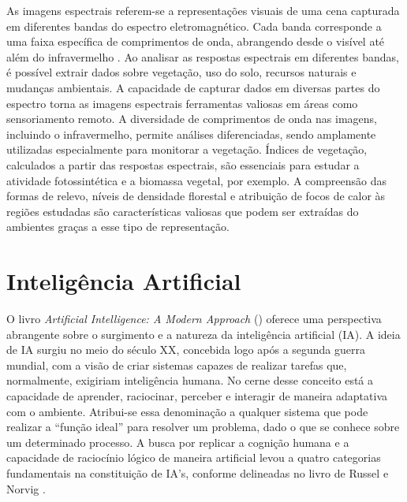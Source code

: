 \documentclass[tcc2]{uftex}
\begin{document}
As imagens espectrais referem-se a representações visuais de uma cena capturada em diferentes bandas do espectro eletromagnético. Cada banda corresponde a uma faixa específica de comprimentos de onda, abrangendo desde o visível até além do infravermelho \cite{novo01:ponzoni}. Ao analisar as respostas espectrais em diferentes bandas, é possível extrair dados sobre vegetação, uso do solo, recursos naturais e mudanças ambientais. A capacidade de capturar dados em diversas partes do espectro torna as imagens espectrais ferramentas valiosas em áreas como sensoriamento remoto. A diversidade de comprimentos de onda nas imagens, incluindo o infravermelho, permite análises diferenciadas, sendo amplamente utilizadas especialmente para monitorar a vegetação. Índices de vegetação, calculados a partir das respostas espectrais, são essenciais para estudar a atividade fotossintética e a biomassa vegetal, por exemplo. A compreensão das formas de relevo, níveis de densidade florestal e atribuição de focos de calor às regiões estudadas são características valiosas que podem ser extraídas do ambientes graças a esse tipo de representação.


\section{Inteligência Artificial}

O livro \textit{Artificial Intelligence: A Modern Approach} (\citeyear{russel20}) oferece uma perspectiva abrangente sobre o surgimento e a natureza da inteligência artificial (IA). A ideia de IA surgiu no meio do século XX, concebida logo após a segunda guerra mundial, com a visão de criar sistemas capazes de realizar tarefas que, normalmente, exigiriam inteligência humana. No cerne desse conceito está a capacidade de aprender, raciocinar, perceber e interagir de maneira adaptativa com o ambiente. Atribui-se essa denominação a qualquer sistema que pode realizar a ``função ideal'' para resolver um problema, dado o que se conhece sobre um determinado processo. A busca por replicar a cognição humana e a capacidade de raciocínio lógico de maneira artificial levou a quatro categorias fundamentais na constituição de IA's, conforme delineadas no livro de Russel e Norvig \cite{russel20}.
\end{document}
